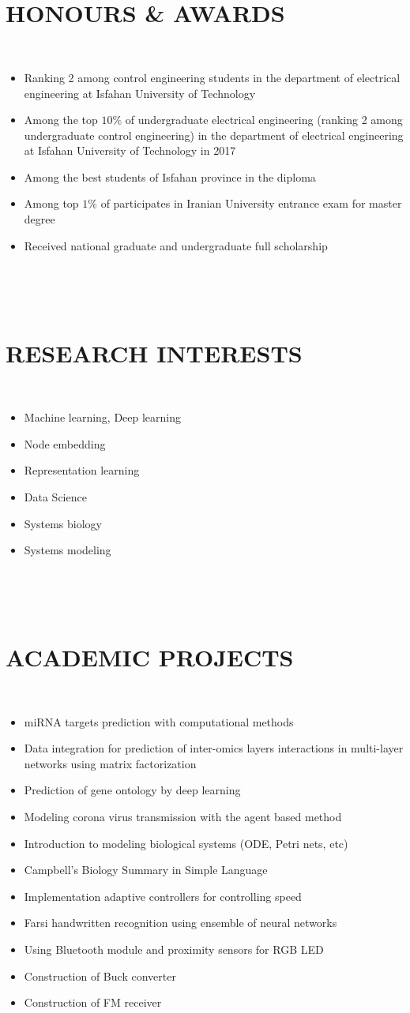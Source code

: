 ‎\documentclass[margin‎, ‎10pt]{res} %
\begin{document}
\begin{resume}
‎\section{HONOURS \& AWARDS}‎
‎\begin{itemize}‎ 
‎\item Ranking 2 among control engineering students in the department of electrical engineering at Isfahan University of Technology‎ 
‎\item Among the top $ 10 \% $ of undergraduate electrical engineering (ranking 2 among undergraduate control engineering) in the department of electrical engineering at Isfahan University of Technology in 2017‎ 
‎\item Among the best students of Isfahan province in the diploma
‎\item Among top $ 1 \% $ of participates in Iranian University entrance exam for master degree‎
‎\item Received national graduate and undergraduate full scholarship‎
‎\end{itemize}‎ 

‎\section{RESEARCH INTERESTS}‎
‎\begin{itemize}‎ 
‎\item Machine learning‎, ‎Deep learning‎
‎\item Node embedding‎
‎\item Representation learning‎
‎\item Data Science‎
‎\item Systems biology‎
‎\item Systems modeling‎ 
‎\end{itemize}‎ 

‎\section{ACADEMIC PROJECTS}‎
‎\begin{itemize}‎ 
‎\item miRNA targets prediction with computational methods‎
‎\item Data integration for prediction of inter-omics layers interactions in multi-layer networks using matrix factorization‎
‎\item Prediction of gene ontology by deep learning‎ 
‎\item Modeling corona virus transmission with the agent based method‎
‎\item Introduction to modeling biological systems (ODE‎, ‎Petri nets‎, etc‎)‎
‎\item Campbell's Biology Summary in Simple Language‎
‎\item Implementation adaptive controllers for controlling speed‎
‎\item Farsi handwritten recognition using ensemble of neural networks
‎\item Using Bluetooth module and proximity sensors for RGB LED‎ 
‎\item Construction of Buck converter‎
‎\item Construction of FM receiver‎
  

\end{itemize}
\end{resume}
\end{document}
